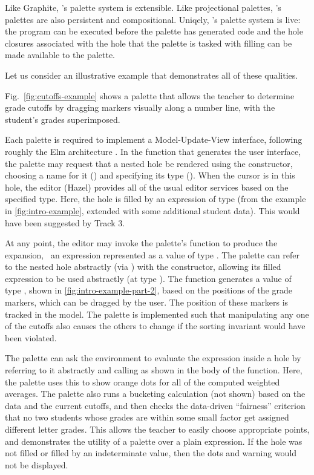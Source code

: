 Like Graphite, \Hazel's palette system is extensible. 
Like projectional palettes, \Hazel's palettes are also persistent and compositional. 
Uniqely, \Hazel's palette system is live: the program 
can be executed before the palette has generated code
and the hole closures associated with the hole that the 
palette is tasked with filling can be made available to 
the palette.

Let us consider an illustrative example that demonstrates
all of these qualities. 

Fig.~\ref{fig:cutoffs-example} shows a palette that allows the teacher to determine grade cutoffs by dragging markers visually along a number line, with the student's grades superimposed.

%
Each palette is required to implement a
Model-Update-View interface, following roughly the Elm architecture \cite{ElmArchitecture}. 
In the function  that generates the user
interface, the palette may request that a nested hole be
rendered using the  constructor, choosing a
name for it () and specifying its type (). When the cursor is in this hole, the editor (Hazel) provides all of the usual editor services based on the specified type. Here, the  hole 
is filled by an expression  of type  (from the example in \autoref{fig:intro-example}, extended with some additional student data). This would have been suggested by Track 3.
%

At any point, the editor may invoke the palette's
 function to produce the expansion, \ie{}~an expression
represented as a value of type . The palette can refer to
the nested hole abstractly (via ) 
with the  constructor, allowing its filled
expression to be used abstractly (at type ). The  function generates a value of type ,
shown in \autoref{fig:intro-example-part-2}, based on the positions of the grade markers,
which can be dragged by the user. The position of these markers is tracked in the model. The palette is implemented such that manipulating any one of the cutoffs also causes the others to change if the sorting invariant would have been violated.

The palette can ask the environment to evaluate the expression
 inside a hole by referring to it abstractly and calling  as shown in the body 
 of the  function. Here, the palette uses this to show orange dots for all of 
 the computed weighted averages. The palette also runs a bucketing calculation (not shown)
based on the data and the current cutoffs, and then checks
the data-driven ``fairness'' criterion that no two students
whose grades are within some small factor get assigned
different letter grades. This allows the teacher to easily choose appropriate points, and demonstrates the utility of a palette over a plain expression. 
 If the hole was not filled or filled by an indeterminate value, then 
 the dots and warning would not be displayed.

